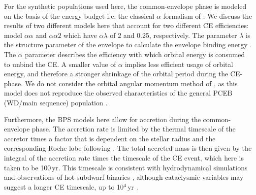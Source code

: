\documentclass[twocolumn]{aastex631}
\begin{document}
For the synthetic populations used here, the common-envelope phase is modeled on the basis of the energy budget i.e. the classical $\alpha$-formalism of  \citet{Tutukov1979}. We discuss the results of two different models here that account for two different CE efficiencies: model $\alpha\alpha$ and $\alpha\alpha2$ which have $\alpha\lambda$ of 2 and 0.25, respectively. The parameter $\lambda$ is the structure parameter of the envelope to calculate the envelope binding energy \citep{Paczynski1976, Webbink1984, deKool1987, Livio1988, deKool1990, Xu2010}. 
The $\alpha$ parameter describes the efficiency with which orbital energy  is consumed to unbind the CE. A smaller value of $\alpha$ implies less efficient usage of orbital energy, and therefore a stronger shrinkage of the orbital period during the CE-phase. 
We do not consider the orbital angular momentum method of  \citet{Nelemans2000}, as this model does not reproduce the observed characteristics of the general PCEB (WD/main sequence) population  \citep{Toonen2013}.

Furthermore, the BPS models here allow for accretion during the common-envelope phase. The accretion rate is limited by the thermal timescale of the accretor times a factor that is dependent on the stellar radius and the corresponding Roche lobe \citep{Portegies1996, Toonen2012} following \citet{Kippenhahn1977, Neo1977,Packet1979,Pols1994}. The total accreted mass is then given by the integral of the accretion rate times the timescale of the CE event, which here is taken to be 100\,yr. This timescale is consistent with hydrodynamical simulations \citep{Ricker2008,Ivanova2013} and observations of hot subdwarf binaries \citep{Igoshev2020}, although cataclysmic variables may suggest a longer CE timescale, up to 10$^4$\,yr \citep{Michaely2019, Igoshev2020}. 

\end{document}
